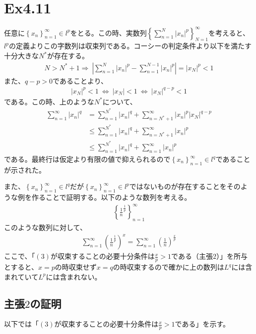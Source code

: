 \documentclass{article}
\begin{document}
\section{Ex4.11}
任意に$\left\{ x_n \right\}_{n = 1}^{\infty} \in l^p$をとる。この時、実数列$\left\{ \sum_{n = 1}^N |x_n|^p \right\}_{N = 1}^{\infty}$を考えると、$l^p$の定義よりこの字数列は収束列である。コーシーの判定条件より以下を満たす十分大きな$N^*$が存在する。
\begin{align*}
	N > N^* + 1 \Rightarrow\ \left| \sum_{n = 1}^N |x_n|^p - \sum_{n = 1}^{N-1} |x_n|^p \right| = |x_N|^p < 1
\end{align*}
また、$q- p > 0$であることより、
\begin{align*}
	|x_N|^p < 1\ \Leftrightarrow\ |x_N| < 1\ \Leftrightarrow\ |x_N|^{q-p} < 1
\end{align*}
である。この時、上のような$N^*$について、
\begin{align*}
	\sum_{n = 1}^{\infty} |x_n|^q &= \sum_{n = 1}^{N^*} |x_n|^q + \sum_{n = N^* +1}^\infty |x_n|^p |x_N|^{q-p}\\
	&\leq \sum_{n = 1}^{N^*} |x_n|^q + \sum_{n = N^* +1}^\infty |x_n|^p\\
	&\leq \sum_{n = 1}^{N^*} |x_n|^q + \sum_{n =1}^\infty |x_n|^p
\end{align*}
である。最終行は仮定より有限の値で抑えられるので$\left\{ x_n \right\}_{n = 1}^{\infty} \in l^q$であることが示された。

また、$\left\{ x_n \right\}_{n = 1}^{\infty} \in l^q$だが$\left\{ x_n \right\}_{n = 1}^{\infty} \in l^p$ではないものが存在することをそのような例を作ることで証明する。以下のような数列を考える。
\begin{align*}
	\left\{ \frac{1}{n}^{\frac{1}{p}} \right\}_{n = 1}^{\infty}
\end{align*}
このような数列に対して、
\begin{align}
	\sum_{n = 1}^{\infty} \left( \frac{1}{n}^{\frac{1}{p}} \right)^{x} = \sum_{n = 1}^{\infty} \left(\frac{1}{n}\right)^{\frac{x}{p}}
\end{align}
ここで、「$(3)$が収束することの必要十分条件は$\frac{x}{p} > 1$である（主張$2$）」を所与とすると、$x = p$の時収束せず$x = q$の時収束するので確かに上の数列は$L^q$には含まれていて$L^p$には含まれない。

\subsection{主張$2$の証明}
以下では「$(3)$が収束することの必要十分条件は$\frac{x}{p} > 1$である」を示す。
\end{document}
